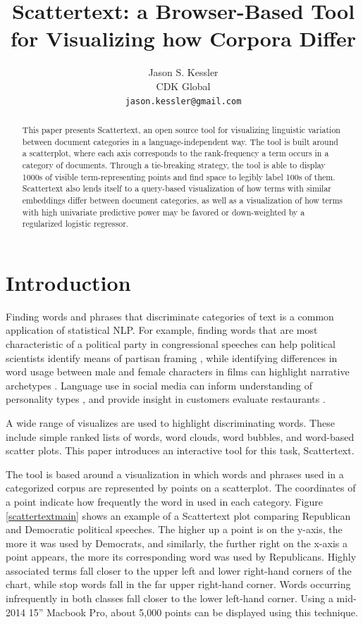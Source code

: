 \documentclass[11pt,a4paper]{article}
\title{Scattertext: a Browser-Based Tool for Visualizing how Corpora Differ}
\author{Jason S. Kessler \\
  CDK Global \\
  {\tt jason.kessler@gmail.com}  \\}
\date{}
\begin{document}
\maketitle
\begin{abstract}
This paper presents Scattertext, an open source tool for visualizing linguistic variation between document categories in a language-independent way. The tool is built around a scatterplot, where each axis corresponds to the rank-frequency a term occurs in a category of documents.  Through a tie-breaking strategy, the tool is able to display 1000s of visible term-representing points and find space to legibly label 100s of them.   Scattertext also lends itself to a query-based visualization of how terms with similar embeddings differ between document categories, as well as a visualization of how terms with high univariate predictive power may be favored or down-weighted by a regularized logistic regressor. 
\end{abstract}
\section{Introduction}
Finding words and phrases that discriminate categories of text is a common application of statistical NLP. For example, finding words that are most characteristic of a political party in congressional speeches can help political scientists identify means of partisan framing \cite{monroe08,grimmer2010}, while identifying differences in word usage between male and female characters in films can highlight narrative archetypes \cite{schofield2016gender}.  Language use in social media can inform understanding of personality types \cite{Schwartz13}, and provide insight in customers evaluate restaurants \cite{jurafsky2014}.

A wide range of visualizes are used to highlight discriminating words.  These include simple ranked lists of words, word clouds, word bubbles, and word-based scatter plots.  This paper introduces an interactive tool for this task, Scattertext.

The tool is based around a visualization in which words and phrases used in a categorized corpus are represented by points on a scatterplot.  The coordinates of a point indicate how frequently the word in used in each category.  Figure \ref{scattertextmain} shows an example of a Scattertext plot comparing Republican and Democratic political speeches.  The higher up a point is on the y-axis, the more it was used by Democrats, and similarly, the further right on the x-axis a point appears, the more its corresponding word was used by Republicans.  Highly associated terms fall closer to the upper left and lower right-hand corners of the chart, while stop words fall in the far upper right-hand corner.  Words occurring infrequently in both classes fall closer to the lower left-hand corner.  Using a mid-2014 15'' Macbook Pro, about 5,000 points can be displayed using this technique.
\end{document}
